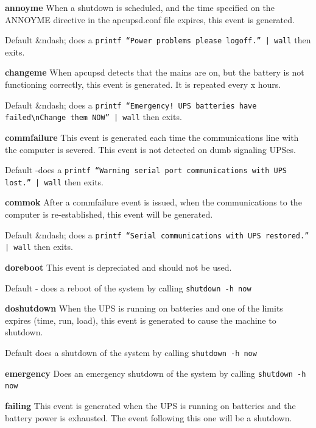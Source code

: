 \begin{description}

\item {\bf annoyme}
When a shutdown is scheduled, and the time specified on the ANNOYME directive
in the apcupsd.conf file expires, this event is generated.  

Default \&ndash; does a {\tt printf ``Power problems please logoff.'' | wall}
then exits.  

\item {\bf changeme}
When apcupsd detects that the mains are on, but the battery is not functioning
correctly, this event is generated. It is repeated every x hours.  

Default \&ndash; does a {\tt printf ``Emergency! UPS batteries have
failed\textbackslash{}nChange them NOW'' | wall} then exits.  

\item {\bf commfailure}
This event is generated each time the communications line with the computer is
severed. This event is not detected on dumb signaling UPSes.  

Default -does a {\tt printf ``Warning serial port communications with UPS
lost.'' | wall} then exits.  

\item {\bf commok}
After a commfailure event is issued, when the communications to the computer
is re-established, this event will be generated.  

Default \&ndash; does a {\tt printf ``Serial communications with UPS
restored.'' | wall} then exits.  

\item {\bf doreboot}
This event is depreciated and should not be used.  

Default - does a reboot of the system by calling {\tt shutdown -h now}  

\item {\bf doshutdown}
When the UPS is running on batteries and one of the limits expires (time, run,
load), this event is generated to cause the machine to shutdown.  

Default does a shutdown of the system by calling {\tt shutdown -h now}  

\item {\bf emergency}
Does an emergency shutdown of the system by calling {\tt shutdown -h now}  

\item {\bf failing}
This event is generated when the UPS is running on batteries and the battery
power is exhausted. The event following this one will be a shutdown.  


\end{description}
